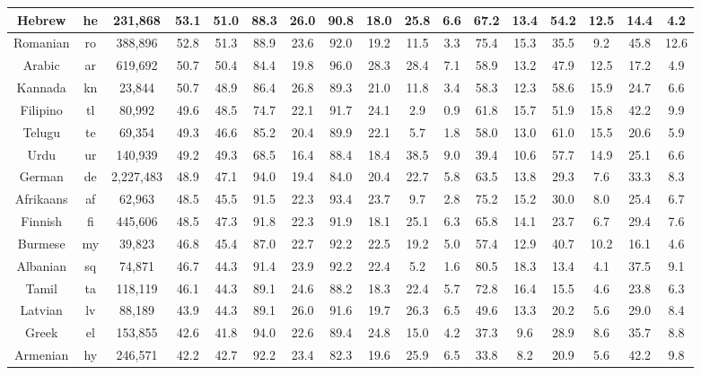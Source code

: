 \begin{table*}
{\begin{tabular}{|c|c|c||c|c|c|c|c|c|c|c|c|c|c|c|c|c|}
Hebrew & he & 231,868 & 53.1 & 51.0 & 88.3 & 26.0 & 90.8 & 18.0 & 25.8 & 6.6 & 67.2 & 13.4 & 54.2 & 12.5 & 14.4 & 4.2\\ \hline
Romanian & ro & 388,896 & 52.8 & 51.3 & 88.9 & 23.6 & 92.0 & 19.2 & 11.5 & 3.3 & 75.4 & 15.3 & 35.5 & 9.2 & 45.8 & 12.6\\ \hline
Arabic & ar & 619,692 & 50.7 & 50.4 & 84.4 & 19.8 & 96.0 & 28.3 & 28.4 & 7.1 & 58.9 & 13.2 & 47.9 & 12.5 & 17.2 & 4.9\\ \hline
Kannada & kn & 23,844 & 50.7 & 48.9 & 86.4 & 26.8 & 89.3 & 21.0 & 11.8 & 3.4 & 58.3 & 12.3 & 58.6 & 15.9 & 24.7 & 6.6\\ \hline
Filipino & tl & 80,992 & 49.6 & 48.5 & 74.7 & 22.1 & 91.7 & 24.1 & 2.9 & 0.9 & 61.8 & 15.7 & 51.9 & 15.8 & 42.2 & 9.9\\ \hline
Telugu & te & 69,354 & 49.3 & 46.6 & 85.2 & 20.4 & 89.9 & 22.1 & 5.7 & 1.8 & 58.0 & 13.0 & 61.0 & 15.5 & 20.6 & 5.9\\ \hline
Urdu & ur & 140,939 & 49.2 & 49.3 & 68.5 & 16.4 & 88.4 & 18.4 & 38.5 & 9.0 & 39.4 & 10.6 & 57.7 & 14.9 & 25.1 & 6.6\\ \hline
German & de & 2,227,483 & 48.9 & 47.1 & 94.0 & 19.4 & 84.0 & 20.4 & 22.7 & 5.8 & 63.5 & 13.8 & 29.3 & 7.6 & 33.3 & 8.3\\ \hline
Afrikaans & af & 62,963 & 48.5 & 45.5 & 91.5 & 22.3 & 93.4 & 23.7 & 9.7 & 2.8 & 75.2 & 15.2 & 30.0 & 8.0 & 25.4 & 6.7\\ \hline
Finnish & fi & 445,606 & 48.5 & 47.3 & 91.8 & 22.3 & 91.9 & 18.1 & 25.1 & 6.3 & 65.8 & 14.1 & 23.7 & 6.7 & 29.4 & 7.6\\ \hline
Burmese & my & 39,823 & 46.8 & 45.4 & 87.0 & 22.7 & 92.2 & 22.5 & 19.2 & 5.0 & 57.4 & 12.9 & 40.7 & 10.2 & 16.1 & 4.6\\ \hline
Albanian & sq & 74,871 & 46.7 & 44.3 & 91.4 & 23.9 & 92.2 & 22.4 & 5.2 & 1.6 & 80.5 & 18.3 & 13.4 & 4.1 & 37.5 & 9.1\\ \hline
Tamil & ta & 118,119 & 46.1 & 44.3 & 89.1 & 24.6 & 88.2 & 18.3 & 22.4 & 5.7 & 72.8 & 16.4 & 15.5 & 4.6 & 23.8 & 6.3\\ \hline
Latvian & lv & 88,189 & 43.9 & 44.3 & 89.1 & 26.0 & 91.6 & 19.7 & 26.3 & 6.5 & 49.6 & 13.3 & 20.2 & 5.6 & 29.0 & 8.4\\ \hline
Greek & el & 153,855 & 42.6 & 41.8 & 94.0 & 22.6 & 89.4 & 24.8 & 15.0 & 4.2 & 37.3 & 9.6 & 28.9 & 8.6 & 35.7 & 8.8\\ \hline
Armenian & hy & 246,571 & 42.2 & 42.7 & 92.2 & 23.4 & 82.3 & 19.6 & 25.9 & 6.5 & 33.8 & 8.2 & 20.9 & 5.6 & 42.2 & 9.8\\ \hline

\end{tabular}}
\end{table*}
